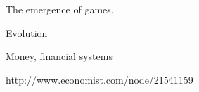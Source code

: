The emergence of games.

Evolution

Money, financial systems

\begin{frame}

http://www.economist.com/node/21541159

\end{frame}